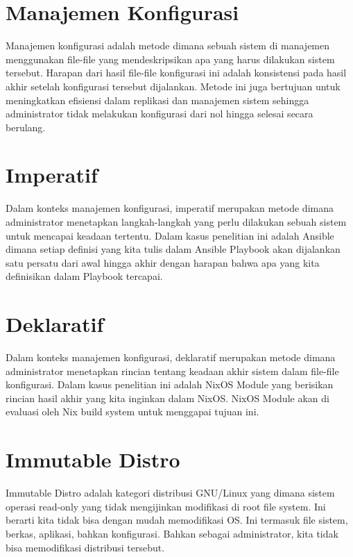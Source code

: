 \documentclass[10pt,twoside]{report}
\begin{document}
\section{Manajemen Konfigurasi}
\begin{adjustwidth}{20pt}{}

	Manajemen konfigurasi adalah metode dimana sebuah sistem di manajemen
	menggunakan file-file yang mendeskripsikan apa yang harus dilakukan sistem
	tersebut. Harapan dari hasil file-file konfigurasi ini adalah konsistensi
	pada hasil akhir setelah konfigurasi tersebut dijalankan. Metode ini juga
	bertujuan untuk meningkatkan efisiensi dalam replikasi dan manajemen sistem
	sehingga administrator tidak melakukan konfigurasi dari nol hingga selesai
	secara berulang.
\end{adjustwidth}
\section{Imperatif}
\begin{adjustwidth}{20pt}{}

	Dalam konteks manajemen konfigurasi, imperatif merupakan metode dimana
	administrator menetapkan langkah-langkah yang perlu dilakukan sebuah sistem
	untuk mencapai keadaan tertentu. Dalam kasus penelitian ini adalah Ansible
	dimana setiap definisi yang kita tulis dalam Ansible Playbook akan dijalankan
	satu persatu dari awal hingga akhir dengan harapan bahwa apa yang kita
	definisikan dalam Playbook tercapai.
\end{adjustwidth}
\section{Deklaratif}
\begin{adjustwidth}{20pt}{}

	Dalam konteks manajemen konfigurasi, deklaratif merupakan metode dimana
	administrator menetapkan rincian tentang keadaan akhir sistem dalam file-file
	konfigurasi. Dalam kasus penelitian ini adalah NixOS Module yang berisikan
	rincian hasil akhir yang kita inginkan dalam NixOS. NixOS Module akan di
	evaluasi oleh Nix build system untuk menggapai tujuan ini.
\end{adjustwidth}
\section{Immutable Distro}
\begin{adjustwidth}{20pt}{}

	Immutable Distro adalah kategori distribusi GNU/Linux yang dimana sistem
	operasi read-only yang tidak mengijinkan modifikasi di root file system. Ini
	berarti kita tidak bisa dengan mudah memodifikasi OS. Ini termasuk file
	sistem, berkas, aplikasi, bahkan konfigurasi. Bahkan sebagai administrator,
	kita tidak bisa memodifikasi distribusi tersebut.
\end{adjustwidth}
\end{document}
